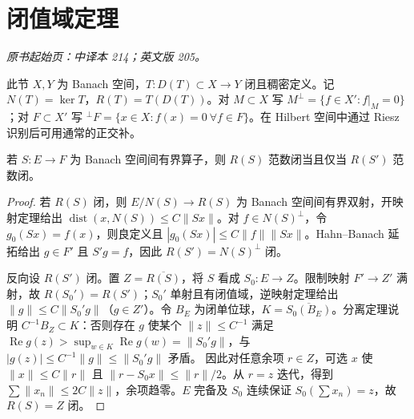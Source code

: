 \section{闭值域定理}\label{sec:yosida-07-05}
\noindent\textit{原书起始页：中译本 214；英文版 205。}

此节 $X,Y$ 为 Banach 空间，$T:D(T)\subset X\to Y$ 闭且稠密定义。记 $N(T)=\ker T$，$R(T)=T(D(T))$。对 $M\subset X$ 写 $M^\perp=\{f\in X':f|_M=0\}$；对 $F\subset X'$ 写 ${}^\perp F=\{x\in X:f(x)=0\ \forall f\in F\}$。在 Hilbert 空间中通过 Riesz 识别后可用通常的正交补。

\begin{lemma}[有界算子的闭值域]\label{lem:y7-bounded-range}
若 $S:E\to F$ 为 Banach 空间间有界算子，则 $R(S)$ 范数闭当且仅当 $R(S')$ 范数闭。
\end{lemma}
\begin{proof}
若 $R(S)$ 闭，则 $E/N(S)\to R(S)$ 为 Banach 空间间有界双射，开映射定理给出 $\operatorname{dist}(x,N(S))\le C\|Sx\|$。对 $f\in N(S)^\perp$，令 $g_0(Sx)=f(x)$，则良定义且 $|g_0(Sx)|\le C\|f\|\|Sx\|$。Hahn--Banach 延拓给出 $g\in F'$ 且 $S'g=f$，因此 $R(S')=N(S)^\perp$ 闭。

反向设 $R(S')$ 闭。置 $Z=\overline{R(S)}$，将 $S$ 看成 $S_0:E\to Z$。限制映射 $F'\to Z'$ 满射，故 $R(S_0')=R(S')$；$S_0'$ 单射且有闭值域，逆映射定理给出 $\|g\|\le C\|S_0'g\|$（$g\in Z'$）。令 $B_E$ 为闭单位球，$K=\overline{S_0(B_E)}$。分离定理说明 $C^{-1}B_Z\subset K$：否则存在 $g$ 使某个 $\|z\|\le C^{-1}$ 满足
$\operatorname{Re}g(z)>\sup_{w\in K}\operatorname{Re}g(w)=\|S_0'g\|$，与 $|g(z)|\le C^{-1}\|g\|\le\|S_0'g\|$ 矛盾。
因此对任意余项 $r\in Z$，可选 $x$ 使 $\|x\|\le C\|r\|$ 且 $\|r-S_0x\|\le\|r\|/2$。从 $r=z$ 迭代，得到 $\sum\|x_n\|\le2C\|z\|$，余项趋零。$E$ 完备及 $S_0$ 连续保证 $S_0(\sum x_n)=z$，故 $R(S)=Z$ 闭。
\end{proof}

